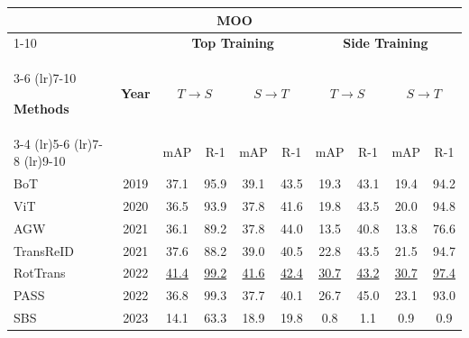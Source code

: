 \documentclass[border=4pt]{standalone}
\begin{document}
\scriptsize
\setlength{\tabcolsep}{6pt}
\begin{tabular}{l c cccc cccc}
            \toprule
            \multicolumn{10}{c}{\textbf{MOO}} \\

            \cmidrule(lr){1-10}

            &
            & \multicolumn{4}{c}{\textbf{Top Training}}
            & \multicolumn{4}{c}{\textbf{Side Training}} \\

            \cmidrule(lr){3-6} \cmidrule(lr){7-10}

            \textbf{Methods} & \textbf{Year}
            & \multicolumn{2}{c}{$T \rightarrow S$}
            & \multicolumn{2}{c}{$S \rightarrow T$}
            & \multicolumn{2}{c}{$T \rightarrow S$}
            & \multicolumn{2}{c}{$S \rightarrow T$} \\

            \cmidrule(lr){3-4} \cmidrule(lr){5-6} \cmidrule(lr){7-8} \cmidrule(lr){9-10}

            & & mAP & R-1 & mAP & R-1
            & mAP & R-1 & mAP & R-1 \\
            \midrule

            BoT & 2019
            & 37.1 & 95.9 & 39.1 & 43.5
            & 19.3 & 43.1 & 19.4 & 94.2 \\

            ViT & 2020
            & 36.5 & 93.9 & 37.8 & 41.6
            & 19.8 & 43.5 & 20.0 & 94.8 \\

            AGW & 2021
            & 36.1 & 89.2 & 37.8 & 44.0
            & 13.5 & 40.8 & 13.8 & 76.6 \\

            TransReID & 2021
            & 37.6 & 88.2 & 39.0 & 40.5
            & 22.8 & 43.5 & 21.5 & 94.7 \\

            RotTrans & 2022
            & \underline{41.4} & \underline{99.2} & \underline{41.6} & \underline{42.4}
            & \underline{30.7} & \underline{43.2} & \underline{30.7} & \underline{97.4}  \\

            PASS & 2022
            & 36.8 & 99.3 & 37.7 & 40.1
            & 26.7 & 45.0 & 23.1 & 93.0 \\

            SBS & 2023
            & 14.1 & 63.3 & 18.9 & 19.8
            & 0.8 & 1.1 & 0.9 & 0.9 \\


\end{tabular}
\end{document}

